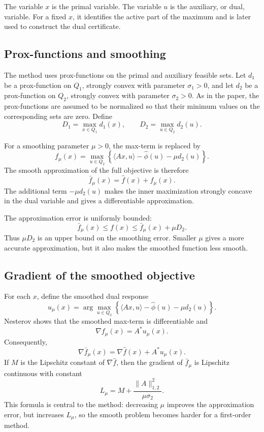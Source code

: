 \documentclass[11pt]{article}
\begin{document}
The variable \(x\) is the primal variable. The variable \(u\) is the auxiliary,
or dual, variable. For a fixed \(x\), it identifies the active part of the
maximum and is later used to construct the dual certificate.

\subsection{Prox-functions and smoothing}

The method uses prox-functions on the primal and auxiliary feasible sets. Let
\(d_1\) be a prox-function on \(Q_1\), strongly convex with parameter
\(\sigma_1>0\), and let \(d_2\) be a prox-function on \(Q_2\), strongly convex
with parameter \(\sigma_2>0\). As in the paper, the prox-functions are assumed
to be normalized so that their minimum values on the corresponding sets are
zero. Define
\[
    D_1=\max_{x\in Q_1}d_1(x),
    \qquad
    D_2=\max_{u\in Q_2}d_2(u).
\]

For a smoothing parameter \(\mu>0\), the max-term is replaced by
\[
    f_\mu(x)
    =
    \max_{u\in Q_2}
    \left\{
        \langle Ax,u\rangle-\hat\phi(u)-\mu d_2(u)
    \right\}.
\]
The smooth approximation of the full objective is therefore
\[
    \bar f_\mu(x)=\hat f(x)+f_\mu(x).
\]
The additional term \(-\mu d_2(u)\) makes the inner maximization strongly
concave in the dual variable and gives a differentiable approximation.

The approximation error is uniformly bounded:
\[
    \bar f_\mu(x)\le f(x)\le \bar f_\mu(x)+\mu D_2.
\]
Thus \(\mu D_2\) is an upper bound on the smoothing error. Smaller \(\mu\) gives
a more accurate approximation, but it also makes the smoothed function less
smooth.

\subsection{Gradient of the smoothed objective}

For each \(x\), define the smoothed dual response
\[
    u_\mu(x)
    =
    \arg\max_{u\in Q_2}
    \left\{
        \langle Ax,u\rangle-\hat\phi(u)-\mu d_2(u)
    \right\}.
\]
Nesterov shows that the smoothed max-term is differentiable and
\[
    \nabla f_\mu(x)=A^*u_\mu(x).
\]
Consequently,
\[
    \nabla \bar f_\mu(x)
    =
    \nabla\hat f(x)+A^*u_\mu(x).
\]
If \(M\) is the Lipschitz constant of \(\nabla\hat f\), then the gradient of
\(\bar f_\mu\) is Lipschitz continuous with constant
\[
    L_\mu
    =
    M+\frac{\|A\|_{1,2}^2}{\mu\sigma_2}.
\]
This formula is central to the method: decreasing \(\mu\) improves the
approximation error, but increases \(L_\mu\), so the smooth problem becomes
harder for a first-order method.
\end{document}
